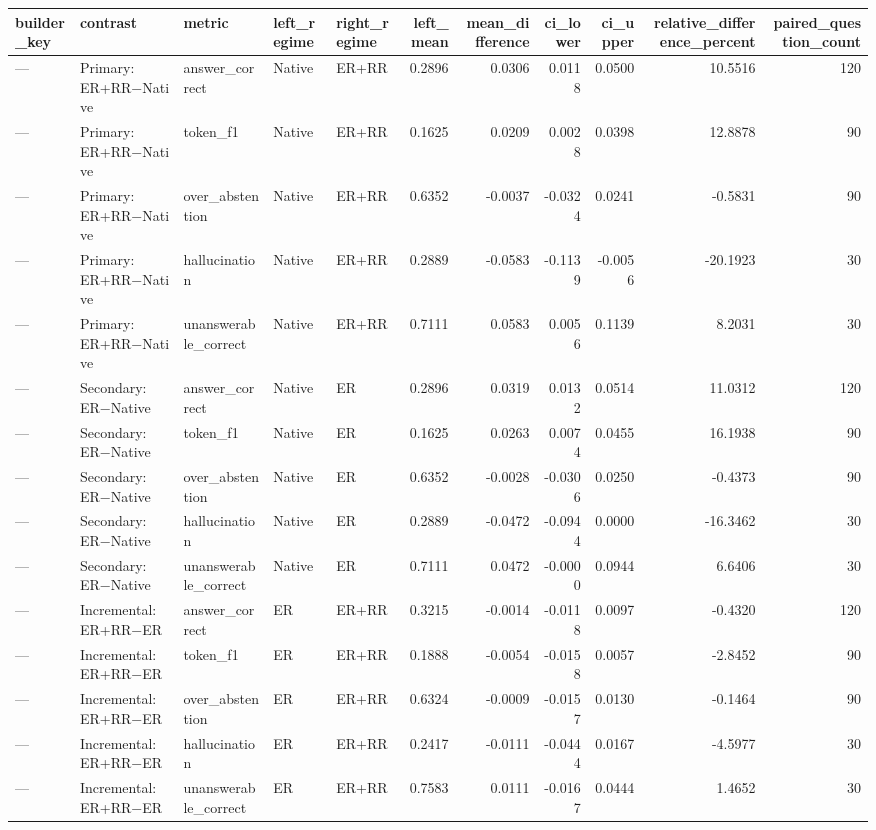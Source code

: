 \begin{tabular}{lllllrrrrrr}
\toprule
builder_key & contrast & metric & left_regime & right_regime & left_mean & mean_difference & ci_lower & ci_upper & relative_difference_percent & paired_question_count \\
\midrule
— & Primary: ER+RR−Native & answer_correct & Native & ER+RR & 0.2896 & 0.0306 & 0.0118 & 0.0500 & 10.5516 & 120 \\
— & Primary: ER+RR−Native & token_f1 & Native & ER+RR & 0.1625 & 0.0209 & 0.0028 & 0.0398 & 12.8878 & 90 \\
— & Primary: ER+RR−Native & over_abstention & Native & ER+RR & 0.6352 & -0.0037 & -0.0324 & 0.0241 & -0.5831 & 90 \\
— & Primary: ER+RR−Native & hallucination & Native & ER+RR & 0.2889 & -0.0583 & -0.1139 & -0.0056 & -20.1923 & 30 \\
— & Primary: ER+RR−Native & unanswerable_correct & Native & ER+RR & 0.7111 & 0.0583 & 0.0056 & 0.1139 & 8.2031 & 30 \\
— & Secondary: ER−Native & answer_correct & Native & ER & 0.2896 & 0.0319 & 0.0132 & 0.0514 & 11.0312 & 120 \\
— & Secondary: ER−Native & token_f1 & Native & ER & 0.1625 & 0.0263 & 0.0074 & 0.0455 & 16.1938 & 90 \\
— & Secondary: ER−Native & over_abstention & Native & ER & 0.6352 & -0.0028 & -0.0306 & 0.0250 & -0.4373 & 90 \\
— & Secondary: ER−Native & hallucination & Native & ER & 0.2889 & -0.0472 & -0.0944 & 0.0000 & -16.3462 & 30 \\
— & Secondary: ER−Native & unanswerable_correct & Native & ER & 0.7111 & 0.0472 & -0.0000 & 0.0944 & 6.6406 & 30 \\
— & Incremental: ER+RR−ER & answer_correct & ER & ER+RR & 0.3215 & -0.0014 & -0.0118 & 0.0097 & -0.4320 & 120 \\
— & Incremental: ER+RR−ER & token_f1 & ER & ER+RR & 0.1888 & -0.0054 & -0.0158 & 0.0057 & -2.8452 & 90 \\
— & Incremental: ER+RR−ER & over_abstention & ER & ER+RR & 0.6324 & -0.0009 & -0.0157 & 0.0130 & -0.1464 & 90 \\
— & Incremental: ER+RR−ER & hallucination & ER & ER+RR & 0.2417 & -0.0111 & -0.0444 & 0.0167 & -4.5977 & 30 \\
— & Incremental: ER+RR−ER & unanswerable_correct & ER & ER+RR & 0.7583 & 0.0111 & -0.0167 & 0.0444 & 1.4652 & 30 \\
\bottomrule
\end{tabular}
